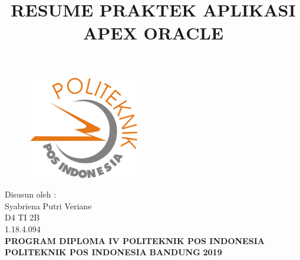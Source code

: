 \documentclass[a4paper, 12pt]{article}
\begin{document}
\title{\huge\textbf{RESUME PRAKTEK APLIKASI APEX ORACLE}}
\date{}

\maketitle


\begin{figure}[!ht]
\begin{center}
\includegraphics[width = 5cm, height = 4.5cm]{gambar/logo.png}
\end{center}
\end{figure}

\begin{center}
\vspace{1cm}
Disusun oleh :\\
Syabriena Putri Veriane\\
D4 TI 2B\\
1.18.4.094\\
\vspace{1cm}
\textbf{PROGRAM DIPLOMA IV POLITEKNIK POS INDONESIA} \linebreak
\textbf{POLITEKNIK POS INDONESIA} \linebreak
\textbf{BANDUNG}\linebreak
\textbf{2019}

\end{center}

\thispagestyle{empty}


\end{document}
